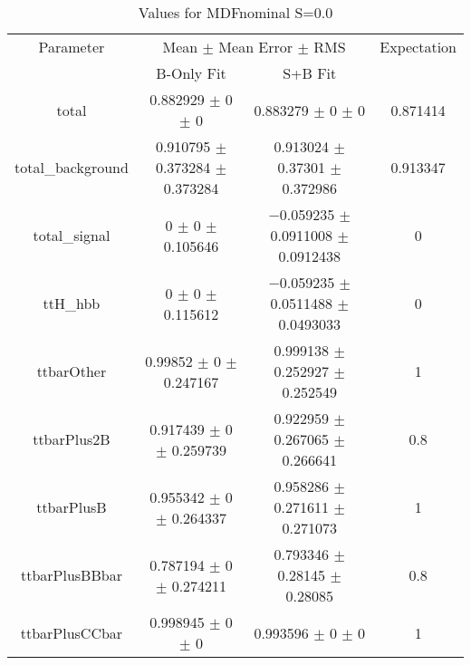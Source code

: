 \begin{table}
\centering
\caption{Values for MDFnominal S=0.0}
\begin{tabular}{cccc}
\toprule
Parameter & \multicolumn{2}{c}{Mean $\pm$ Mean Error $\pm$ RMS} & Expectation\\
 & B-Only Fit & S+B Fit & \\
\midrule
total & \num{0.882929} $\pm$ \num{0} $\pm$ \num{0} & \num{0.883279} $\pm$ \num{0} $\pm$ \num{0} & \num{0.871414}\\
total\_background & \num{0.910795} $\pm$ \num{0.373284} $\pm$ \num{0.373284} & \num{0.913024} $\pm$ \num{0.37301} $\pm$ \num{0.372986} & \num{0.913347}\\
total\_signal & \num{0} $\pm$ \num{0} $\pm$ \num{0.105646} & \num{-0.059235} $\pm$ \num{0.0911008} $\pm$ \num{0.0912438} & \num{0}\\
ttH\_hbb & \num{0} $\pm$ \num{0} $\pm$ \num{0.115612} & \num{-0.059235} $\pm$ \num{0.0511488} $\pm$ \num{0.0493033} & \num{0}\\
ttbarOther & \num{0.99852} $\pm$ \num{0} $\pm$ \num{0.247167} & \num{0.999138} $\pm$ \num{0.252927} $\pm$ \num{0.252549} & \num{1}\\
ttbarPlus2B & \num{0.917439} $\pm$ \num{0} $\pm$ \num{0.259739} & \num{0.922959} $\pm$ \num{0.267065} $\pm$ \num{0.266641} & \num{0.8}\\
ttbarPlusB & \num{0.955342} $\pm$ \num{0} $\pm$ \num{0.264337} & \num{0.958286} $\pm$ \num{0.271611} $\pm$ \num{0.271073} & \num{1}\\
ttbarPlusBBbar & \num{0.787194} $\pm$ \num{0} $\pm$ \num{0.274211} & \num{0.793346} $\pm$ \num{0.28145} $\pm$ \num{0.28085} & \num{0.8}\\
ttbarPlusCCbar & \num{0.998945} $\pm$ \num{0} $\pm$ \num{0} & \num{0.993596} $\pm$ \num{0} $\pm$ \num{0} & \num{1}\\
\bottomrule
\end{tabular}
\end{table}